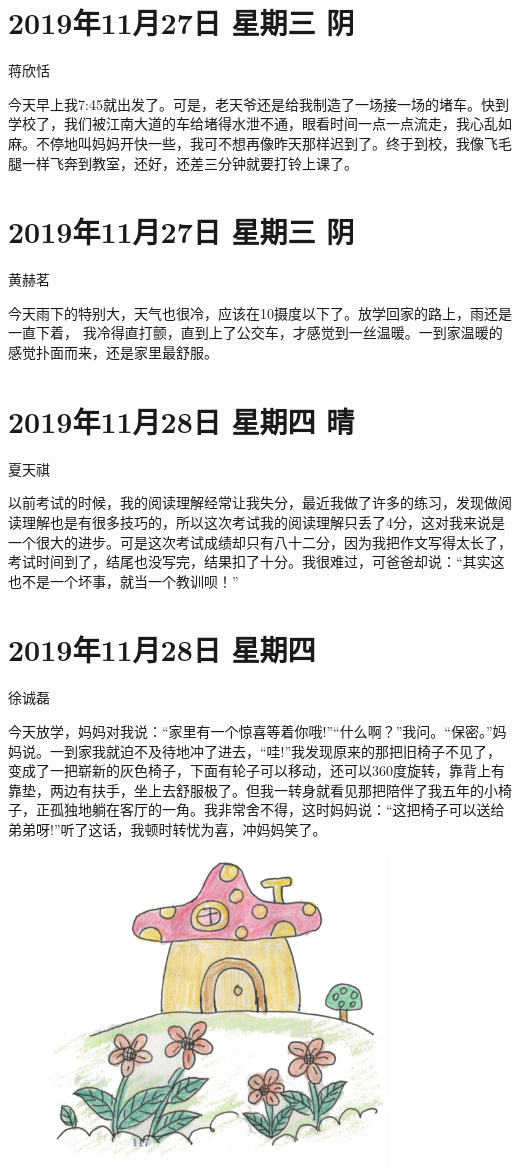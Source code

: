 \section{2019年11月27日 星期三 阴}

蒋欣恬

今天早上我7:45就出发了。可是，老天爷还是给我制造了一场接一场的堵车。快到学校了，我们被江南大道的车给堵得水泄不通，眼看时间一点一点流走，我心乱如麻。不停地叫妈妈开快一些，我可不想再像昨天那样迟到了。终于到校，我像飞毛腿一样飞奔到教室，还好，还差三分钟就要打铃上课了。

\section{2019年11月27日 星期三 阴}

黄赫茗

今天雨下的特别大，天气也很冷，应该在10摄度以下了。放学回家的路上，雨还是一直下着，
我冷得直打颤，直到上了公交车，才感觉到一丝温暖。一到家温暖的感觉扑面而来，还是家里最舒服。

\section{2019年11月28日 星期四 晴}

夏天祺

以前考试的时候，我的阅读理解经常让我失分，最近我做了许多的练习，发现做阅读理解也是有很多技巧的，所以这次考试我的阅读理解只丢了4分，这对我来说是一个很大的进步。可是这次考试成绩却只有八十二分，因为我把作文写得太长了，考试时间到了，结尾也没写完，结果扣了十分。我很难过，可爸爸却说：“其实这也不是一个坏事，就当一个教训呗！”

\section{2019年11月28日 星期四}

徐诚磊

今天放学，妈妈对我说：“家里有一个惊喜等着你哦!”“什么啊？”我问。“保密。”妈妈说。一到家我就迫不及待地冲了进去，“哇!”我发现原来的那把旧椅子不见了，变成了一把崭新的灰色椅子，下面有轮子可以移动，还可以360度旋转，靠背上有靠垫，两边有扶手，坐上去舒服极了。但我一转身就看见那把陪伴了我五年的小椅子，正孤独地躺在客厅的一角。我非常舍不得，这时妈妈说：“这把椅子可以送给弟弟呀!”听了这话，我顿时转忧为喜，冲妈妈笑了。

\begin{figure}[htb]
    \centering
    \includegraphics[width=0.8\textwidth]{figure/04.png}
\end{figure}